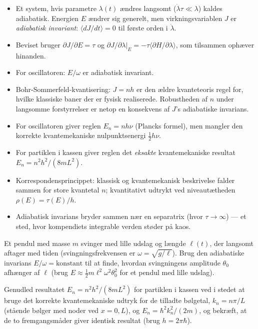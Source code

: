\begin{itemize}
  \item Et system, hvis parametre $\lambda(t)$ ændres langsomt
        ($\dot\lambda\tau\ll\lambda$) kaldes adiabatisk. Energien
        $E$ ændrer sig generelt, men virkningsvariablen $J$ er
        \emph{adiabatisk invariant}: $\langle dJ/dt\rangle=0$ til
        første orden i $\dot\lambda$.
  \item Beviset bruger $\partial J/\partial E=\tau$ og
        $\partial J/\partial\lambda|_E=-\tau\langle\partial H/\partial\lambda\rangle$,
        som tilsammen ophæver hinanden.
  \item For oscillatoren: $E/\omega$ er adiabatisk invariant.
  \item Bohr-Sommerfeld-kvantisering: $J=nh$ er den ældre kvanteteoris
        regel for, hvilke klassiske baner der er fysisk realiserede.
        Robustheden af $n$ under langsomme forstyrrelser er netop en
        konsekvens af $J$'s adiabatiske invarians.
  \item For oscillatoren giver reglen $E_n=nh\nu$ (Plancks formel),
        men mangler den korrekte kvantemekaniske nulpunktsenergi
        $\frac12h\nu$.
  \item For partiklen i kassen giver reglen det \emph{eksakte}
        kvantemekaniske resultat $E_n=n^2h^2/(8mL^2)$.
  \item Korrespondensprincippet: klassisk og kvantemekanisk beskrivelse
        falder sammen for store kvantetal $n$; kvantitativt udtrykt ved
        niveautætheden $\rho(E)=\tau(E)/h$.
  \item Adiabatisk invarians bryder sammen nær en separatrix (hvor
        $\tau\to\infty$) — et sted, hvor kompendiets integrable verden
        støder på kaos.
\end{itemize}

\begin{opgave}
Et pendul med masse $m$ svinger med lille udslag og længde $\ell(t)$,
der langsomt aftager med tiden (svingningsfrekvensen er
$\omega=\sqrt{g/\ell}$). Brug den adiabatiske invarians $E/\omega=\text{konstant}$
til at finde, hvordan svingningens amplitude $\theta_0$ afhænger af
$\ell$ (brug $E\approx\frac12m\ell^2\omega^2\theta_0^2$ for et
pendul med lille udslag).
\end{opgave}

\begin{opgave}
Genudled resultatet $E_n=n^2h^2/(8mL^2)$ for partiklen i kassen ved i
stedet at bruge det korrekte kvantemekaniske udtryk for de tilladte
bølgetal, $k_n=n\pi/L$ (stående bølger med noder ved $x=0,L$), og
$E_n=\hbar^2k_n^2/(2m)$, og bekræft, at de to fremgangsmåder giver
identisk resultat (brug $h=2\pi\hbar$).
\end{opgave}

